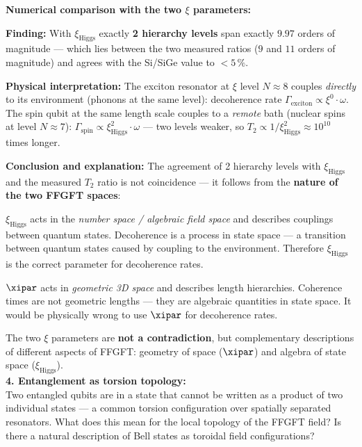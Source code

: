 \begin{significance}
\textbf{Numerical comparison with the two $\xi$ parameters:}
\begin{center}
{\footnotesize{}} %
\end{center}

\textbf{Finding:} With $\xi_\text{Higgs}$ exactly \textbf{2 hierarchy levels}
span exactly $9.97$ orders of magnitude --- which lies between the two
measured ratios ($9$ and $11$ orders of magnitude)
and agrees with the Si/SiGe value to $< 5\,\%$.

\textbf{Physical interpretation:}
The exciton resonator at $\xi$ level $N \approx 8$ couples
\emph{directly} to its environment (phonons at the same level):
decoherence rate $\Gamma_\text{exciton} \propto \xi^0 \cdot \omega$.
The spin qubit at the same length scale couples to a
\emph{remote} bath (nuclear spins at level $N \approx 7$):
$\Gamma_\text{spin} \propto \xi_\text{Higgs}^2 \cdot \omega$ ---
two levels weaker, so $T_2 \propto 1/\xi_\text{Higgs}^2
\approx 10^{10}$ times longer.

\textbf{Conclusion and explanation:}
The agreement of 2 hierarchy levels with $\xi_\text{Higgs}$ and
the measured $T_2$ ratio is not coincidence ---
it follows from the \textbf{nature of the two FFGFT spaces}:

$\xi_\text{Higgs}$ acts in the \emph{number space / algebraic field space}
and describes couplings between quantum states.
Decoherence is a process in state space ---
a transition between quantum states caused by
coupling to the environment.
Therefore $\xi_\text{Higgs}$ is the correct parameter for decoherence rates.

$\xipar$ acts in \emph{geometric 3D space}
and describes length hierarchies.
Coherence times are not geometric lengths ---
they are algebraic quantities in state space.
It would be physically wrong to use $\xipar$ for decoherence rates.

The two $\xi$ parameters are \textbf{not a contradiction},
but complementary descriptions of different aspects of FFGFT:
geometry of space ($\xipar$) and algebra of state space ($\xi_\text{Higgs}$).\\[6pt]

\textbf{4. Entanglement as torsion topology:}\\
Two entangled qubits are in a state
that cannot be written as a product of two individual states ---
a common torsion configuration
over spatially separated resonators.
What does this mean for the local topology
of the FFGFT field?
Is there a natural description of Bell states
as toroidal field configurations?
\end{significance}

